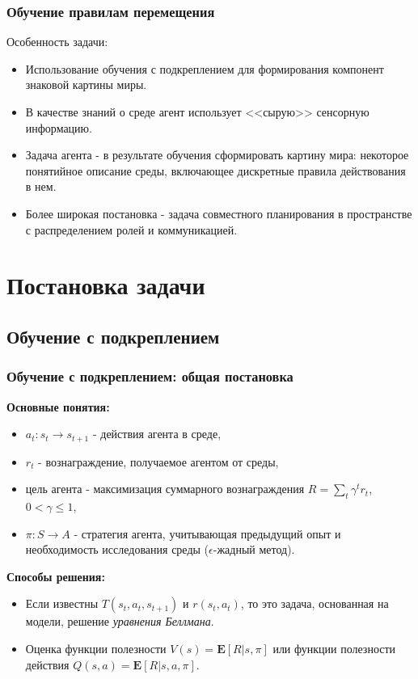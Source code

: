 \documentclass[default]{beamer}
\begin{document}
	\begin{frame}
		\frametitle{Обучение правилам перемещения}
		\footnotesize
		Особенность задачи:
		\begin{itemize}
			\item Использование обучения с подкреплением для формирования компонент знаковой картины миры.
			\item В качестве знаний о среде агент использует <<сырую>> сенсорную информацию.
			\item Задача агента - в результате обучения сформировать картину мира: некоторое понятийное описание среды, включающее дискретные правила действования в нем.
			\item Более широкая постановка - задача совместного планирования в пространстве с распределением ролей и коммуникацией.
		\end{itemize}
		\begin{center}
		\end{center}
	\end{frame}


	\section{Постановка задачи}
	\subsection{Обучение с подкреплением}
	\begin{frame}
		\frametitle{Обучение с подкреплением: общая постановка}
		\textbf{Основные понятия:}
		\begin{itemize}
			\item $a_t: s_t\rightarrow s_{t+1}$ - действия агента в среде,
			\item $r_t$ - вознаграждение, получаемое агентом от среды,
			\item цель агента - максимизация суммарного вознаграждения $R=\sum\limits_{t}{{{\gamma }^{t}}}{{r}_{t}}$, $0<\gamma\le 1 $,
			\item $\pi :S\rightarrow A$ - стратегия агента, учитывающая предыдущий опыт и необходимость исследования среды ($\epsilon$-жадный метод).
		\end{itemize}
	
		\textbf{Способы решения:}
		\begin{itemize}
			\item Если известны $T(s_t,a_t,s_{t+1})$ и $r(s_t,a_t)$, то это задача, основанная на модели, решение \textit{уравнения Беллмана}.
			\item Оценка функции полезности $V(s)=\mathbf{E}[R|s,\pi]$ или функции полезности действия $Q(s,a)=\mathbf{E}[R|s,a,\pi]$.
		\end{itemize}
	\vspace{-5pt}
	\nocite{*}
	\printbibliography[keyword={rlearn}, resetnumbers=true]
	\end{frame}
	
\end{document}
